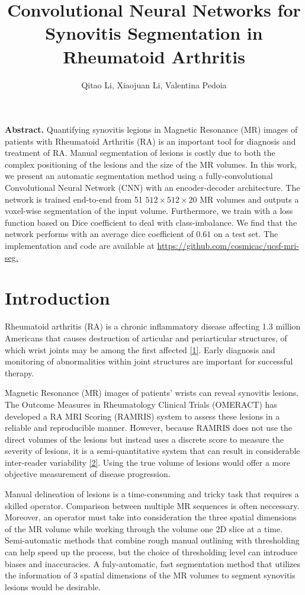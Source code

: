 \documentclass[11pt]{article}
\title{\textbf{Convolutional Neural Networks for Synovitis Segmentation in Rheumatoid Arthritis}}
\date{}
\author{Qitao Li, Xiaojuan Li, Valentina Pedoia}
\begin{document}
\maketitle

\noindent \textbf{Abstract.} Quantifying  synovitis legions in Magnetic Resonance (MR) images of patients with Rheumatoid Arthritis (RA) is an important tool for diagnosis and treatment of RA. Manual segmentation of lesions is costly due to both the complex positioning of the lesions and the size of the MR volumes. In this work, we present an automatic segmentation method using a fully-convolutional Convolutional Neural Network (CNN) with an encoder-decoder architecture. The network is trained end-to-end from 51 $512 \times 512 \times 20$ MR volumes and outputs a voxel-wise segmentation of the input volume. Furthermore, we train with a loss function based on Dice coefficient to deal with class-imbalance. We find that the network performs with an average dice coefficient of $0.61$ on a test set. The implementation and code are available at \url{https://github.com/cosmicac/ucsf-mri-seg.} 

\section{Introduction}

Rheumatoid arthritis (RA) is a chronic inflammatory disease affecting 1.3 million Americans that causes destruction of articular and periarticular structures, of which wrist joints may be among the first affected \hyperref[gab]{[1]}. Early diagnosis and monitoring of abnormalities within joint structures are important for successful therapy.

Magnetic Resonance (MR) images of patients' wrists can reveal synovitis lesions. The Outcome Measures in Rheumatology Clinical Trials (OMERACT) has developed a RA MRI Scoring (RAMRIS) system to assess these lesions in a reliable and reproducible manner. However, because RAMRIS does not use the direct volumes of the lesions but instead uses a discrete score to measure the severity of lesions, it is a semi-quantitative system that can result in considerable inter-reader variability \hyperref[hodge]{[2]}. Using the true volume of lesions would offer a more objective measurement of disease progression. 

Manual delineation of lesions is a time-consuming and tricky task that requires a skilled operator. Comparison between multiple MR sequences is often neccessary. Moreover, an operator must take into consideration the three spatial dimensions of the MR volume while working through the volume one 2D slice at a time. Semi-automatic methods that combine rough manual outlining with thresholding can help speed up the process, but the choice of thresholding level can introduce biases and inaccuracies. A fuly-automatic, fast segmentation method that utilizes the information of 3 spatial dimensions of the MR volumes to segment synovitis lesions would be desirable.
\end{document}
